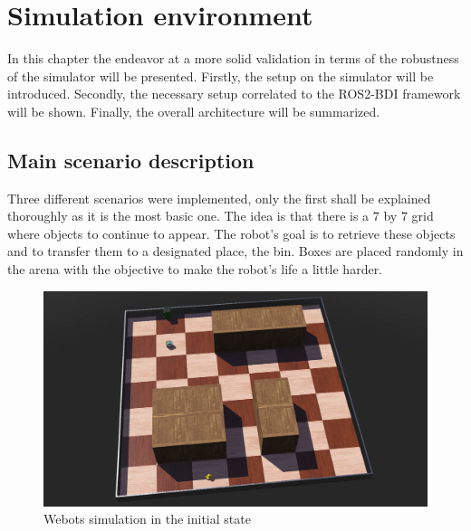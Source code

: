 \chapter{Simulation environment}
\label{cap:3}In this chapter the endeavor at a more solid validation in terms of the robustness of the simulator will be presented. Firstly, the setup on the simulator will be introduced. Secondly, the necessary setup correlated to the ROS2-BDI framework will be shown. Finally, the overall architecture will be summarized.
\section{Main scenario description}
Three different scenarios were implemented, only the first shall be explained thoroughly as it is the most basic one. The idea is that there is a $7$  by $7$ grid where objects to continue to appear. The robot's goal is to retrieve these objects and to transfer them to a designated place, the bin. Boxes are placed randomly in the arena with the objective to make the robot's life a little harder.
\begin{figure}[H]
\centering
\includegraphics[width=\textwidth]{images/simulation_screen.png}
\caption{Webots simulation in the initial state}
\end{figure}
